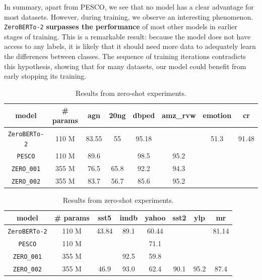 \documentclass[]{politex-xico}
\begin{document}
In summary, apart from PESCO, we see that no model has a clear advantage for most datasets. However, during training, we observe an interesting phenomenon. \texttt{ZeroBERTo-2} \textbf{surpasses the performance} of most other models in earlier stages of training. This is a remarkable result: because the model does not have access to any labels, it is likely that it should need more data to adequately learn the differences between classes. The sequence of training iterations contradicts this hypothesis, showing that for many datasets, our model could benefit from early stopping its training. 


\begin{table}[]
\caption{Results from zero-shot experiments.}
\begin{tabular}{|c|c|c|c|c|c|l|l|}
\hline
model    & \# params & agn   & 20ng & dbped & amz\_rvw              & \multicolumn{1}{c|}{emotion} & \multicolumn{1}{c|}{cr}    \\ \hline
\texttt{ZeroBERTo-2}  & 110 M     & 83.55 & 55   & 95.18 & \multicolumn{1}{l|}{} & \multicolumn{1}{c|}{51.3}    & \multicolumn{1}{c|}{91.48} \\ \hline
\texttt{PESCO}              & 110 M & 89.6 & \multicolumn{1}{l|}{} & 98.5 & 95.2 &  &  \\ \hline
\texttt{ZERO\_001}  & 355 M & 76.5 & 65.8                  & 92.2 & 94.3 &  &  \\ \hline
\texttt{ZERO\_002}        & 355 M & 83.7 & 56.7                  & 85.6 & 95.2 &  &  \\ \hline
\end{tabular}
\label{tab:zs1}
\end{table}

\begin{table}[t]
\caption{Results from zero-shot experiments.}

\begin{tabular}{|c|c|c|c|c|l|l|c|}
\hline
model            & \# params & sst5                  & imdb                  & yahoo & \multicolumn{1}{c|}{sst2} & \multicolumn{1}{c|}{ylp}  & mr                    \\ \hline
\texttt{ZeroBERTo-2}   & 110 M & 43.84 & 89.1 & 60.44 &  &  & 81.14 \\ \hline
\texttt{PESCO}               & 110 M     & \multicolumn{1}{l|}{} & \multicolumn{1}{l|}{} & 71.1  &                           &                           & \multicolumn{1}{l|}{} \\ \hline
\texttt{ZERO\_001} & 355 M     & \multicolumn{1}{l|}{} & 92.5                  & 59.8  &                           &                           & \multicolumn{1}{l|}{} \\ \hline
\texttt{ZERO\_002}       & 355 M     & 46.9                  & 93.0                  & 62.4  & \multicolumn{1}{c|}{90.1} & \multicolumn{1}{c|}{95.2} & 87.4                  \\ \hline
\end{tabular}
\label{tab:zs2}

\end{table}
\end{document}
